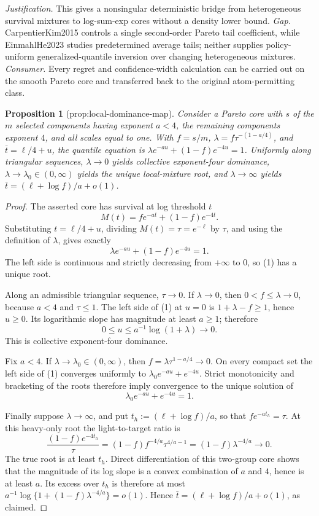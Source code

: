 \documentclass{article}
\newtheorem{proposition}{Proposition}
\begin{document}
\par\smallskip\noindent \textit{Justification.} This gives a nonsingular deterministic bridge from heterogeneous survival mixtures to log-sum-exp cores without a density lower bound. \textit{Gap.} CarpentierKim2015 controls a single second-order Pareto tail coefficient, while EinmahlHe2023 studies predetermined average tails; neither supplies policy-uniform generalized-quantile inversion over changing heterogeneous mixtures. \textit{Consumer.} Every regret and confidence-width calculation can be carried out on the smooth Pareto core and transferred back to the original atom-permitting class.

\begin{proposition}[prop:local-dominance-map]\label{prop:local-dominance-map}
Consider a Pareto core with \(s\) of the \(m\) selected components having exponent \(a<4\), the remaining components exponent \(4\), and all scales equal to one. With \(f=s/m\), \(\lambda=f\tau^{-(1-a/4)}\), and \(\bar t=\ell/4+u\), the quantile equation is \(\lambda e^{-au}+(1-f)e^{-4u}=1\). Uniformly along triangular sequences, \(\lambda\to0\) yields collective exponent-four dominance, \(\lambda\to\lambda_0\in(0,\infty)\) yields the unique local-mixture root, and \(\lambda\to\infty\) yields \(\bar t=(\ell+\log f)/a+o(1)\).
\end{proposition}
\begin{proof}
The asserted core has survival at log threshold \(t\)
\[
M(t)=f e^{-at}+(1-f)e^{-4t}.
\]
Substituting \(t=\ell/4+u\), dividing \(M(t)=\tau=e^{-\ell}\) by \(\tau\), and using the definition of \(\lambda\), gives exactly
\[
\lambda e^{-au}+(1-f)e^{-4u}=1.                                         \tag{1}
\]
The left side is continuous and strictly decreasing from \(+\infty\) to \(0\), so (1) has a unique root.

Along an admissible triangular sequence, \(\tau\to0\).  If \(\lambda\to0\), then \(0<f\leq\lambda\to0\), because \(a<4\) and \(\tau\leq1\).  The left side of (1) at \(u=0\) is \(1+\lambda-f\geq1\), hence \(u\geq0\).  Its logarithmic slope has magnitude at least \(a\geq1\); therefore
\[
0\leq u\leq a^{-1}\log(1+\lambda)\longrightarrow0.
\]
This is collective exponent-four dominance.

Fix \(a<4\).  If \(\lambda\to\lambda_0\in(0,\infty)\), then \(f=\lambda\tau^{1-a/4}\to0\).  On every compact set the left side of (1) converges uniformly to \(\lambda_0e^{-au}+e^{-4u}\).  Strict monotonicity and bracketing of the roots therefore imply convergence to the unique solution of
\[
\lambda_0e^{-au}+e^{-4u}=1.
\]

Finally suppose \(\lambda\to\infty\), and put \(t_h:=(\ell+\log f)/a\), so that \(fe^{-at_h}=\tau\).  At this heavy-only root the light-to-target ratio is
\[
\frac{(1-f)e^{-4t_h}}{\tau}
=(1-f)f^{-4/a}\tau^{4/a-1}
=(1-f)\lambda^{-4/a}\longrightarrow0.                                  \tag{2}
\]
The true root is at least \(t_h\).  Direct differentiation of this two-group core shows that the magnitude of its log slope is a convex combination of \(a\) and \(4\), hence is at least \(a\).  Its excess over \(t_h\) is therefore at most \(a^{-1}\log\{1+(1-f)\lambda^{-4/a}\}=o(1)\).  Hence \(\bar t=(\ell+\log f)/a+o(1)\), as claimed.
\end{proof}
\end{document}
